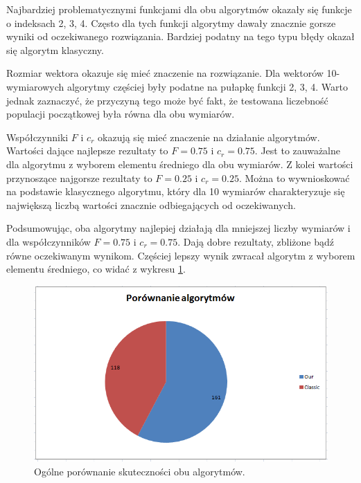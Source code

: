 \documentclass[a4paper]{article}
\begin{document}
Najbardziej problematycznymi funkcjami dla obu algorytmów okazały się funkcje o indeksach 2, 3, 4. Często dla tych funkcji algorytmy dawały znacznie gorsze wyniki od oczekiwanego rozwiązania. Bardziej podatny na tego typu błędy okazał się algorytm klasyczny. 

Rozmiar wektora okazuje się mieć znaczenie na rozwiązanie. Dla wektorów 10-wymiarowych algorytmy częściej były podatne na pułapkę funkcji 2, 3, 4. Warto jednak zaznaczyć, że przyczyną tego może być fakt, że testowana liczebność populacji początkowej była równa dla obu wymiarów. 

Współczynniki $F$ i $c_r$ okazują się mieć znaczenie na działanie algorytmów. Wartości dające najlepsze rezultaty to $F=0.75$ i $c_r=0.75$. Jest to zauważalne dla algorytmu z wyborem elementu średniego dla obu wymiarów. Z kolei wartości przynoszące najgorsze rezultaty to $F=0.25$ i $c_r=0.25$. Można to wywnioskować na podstawie klasycznego algorytmu, który dla 10 wymiarów charakteryzuje się największą liczbą wartości znacznie odbiegających od oczekiwanych.

Podsumowując, oba algorytmy najlepiej działają dla mniejszej liczby wymiarów i dla współczynników $F=0.75$ i $c_r=0.75$. Dają dobre rezultaty, zbliżone bądź równe oczekiwanym wynikom. Częściej lepszy wynik zwracał algorytm z wyborem elementu średniego, co widać z wykresu \ref{rys:statystyka}.

\begin{figure}[!h]
\centering
\includegraphics[width=\textwidth]{statystyka.png}
\caption{Ogólne porównanie skuteczności obu algorytmów.}
\label{rys:statystyka}
\end{figure}
\end{document}
